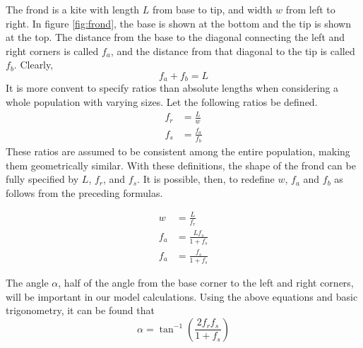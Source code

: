 \documentclass{article}
\begin{document}
\begin{multicols}{2}
The frond is a kite with length $L$ from base to tip, and width $w$ from left to right.
 In figure \ref{fig:frond}, the base is shown at the bottom and the tip is shown at the top.
 The distance from the base to the diagonal connecting the left and right corners is called $f_a$, and the distance from that diagonal to the tip is called $f_b$.
 Clearly,
 \begin{equation}
	 f_a + f_b = L
 \end{equation}
 It is more convent to specify ratios than absolute lengths when considering a whole population with varying sizes.
 Let the following ratios be defined.
\begin{align}
	f_r &= \frac{L}{w} \\
	f_s &= \frac{f_a}{f_b}
\end{align}
These ratios are assumed to be consistent among the entire population, making them geometrically similar.
With these definitions, the shape of the frond can be fully specified by $L$, $f_r$, and $f_s$.
It is possible, then, to redefine $w$, $f_a$ and $f_b$ as follows from the preceding formulas.

\begin{align}
	w &= \frac{L}{f_r} \\
	f_a &= \frac{Lf_s}{1+f_s} \\
	f_a &= \frac{f_s}{1+f_s}
\end{align}

The angle $\alpha$, half of the angle from the base corner to the left and right corners, will be important in our model calculations.
Using the above equations and basic trigonometry, it can be found that
\begin{equation}
	\alpha = \tan^{-1}\left(\frac{2f_rf_s}{1+f_s}\right)
\end{equation}


\end{multicols}
\end{document}

